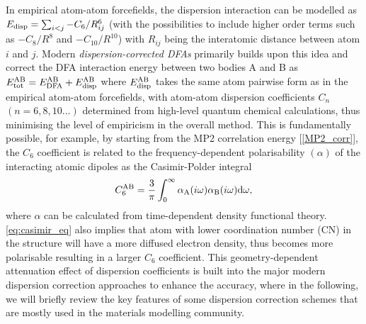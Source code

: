 In empirical atom-atom forcefields, the dispersion interaction can be modelled as $E_{\mbox{\scriptsize{disp}}}=\sum_{i<j}-C_6/R^6_{ij}$ (with the possibilities to include higher order terms such as $-C_8/R^8$ and $-C_{10}/R^{10}$) with $R_{ij}$ being the interatomic distance between atom $i$ and $j$. Modern \emph{dispersion-corrected DFAs}\cite{grimme2016dispersion} primarily builds upon this idea and correct the DFA interaction energy between two bodies A and B as $E_{\mbox{\scriptsize{tot}}}^{\mbox{\scriptsize{AB}}}=E_{\mbox{\scriptsize{DFA}}}^{\mbox{\scriptsize{AB}}}+E_{\mbox{\scriptsize{disp}}}^{\mbox{\scriptsize{AB}}}$ where $E_{\mbox{\scriptsize{disp}}}^{\mbox{\scriptsize{AB}}}$ takes the same atom pairwise form as in the empirical atom-atom forcefields, with atom-atom dispersion coefficients $C_{n}$ $(n=6,8,10\ldots)$ determined from high-level quantum chemical calculations, thus minimising the level of empiricism in the overall method. This is fundamentally possible, for example, by starting from the MP2 correlation energy [\cref{MP2_corr}], the $C_6$ coefficient is related to the frequency-dependent  polarisability $(\alpha)$ of the interacting atomic dipoles as the Casimir-Polder integral\cite{casimir1948influence} 
\begin{equation}\label{eq:casimir_eq}
    C_6^{\mbox{\scriptsize{AB}}}=\frac{3}{\pi}\int_{0}^{\infty} \alpha_{\mbox{\scriptsize{A}}}(i\omega)\alpha_{\mbox{\scriptsize{B}}}(i\omega)\mbox{d}\omega,
\end{equation}
where $\alpha$ can be calculated from time-dependent density functional theory. \cref{eq:casimir_eq} also implies that atom with lower coordination number (CN) in the structure will have a more diffused electron density, thus becomes more polarisable resulting in a larger $C_6$ coefficient. This geometry-dependent attenuation effect of dispersion coefficients is built into the major modern dispersion correction approaches to enhance the accuracy, where in the following, we will briefly review the key features of some dispersion correction schemes that are mostly used in the materials modelling community. 
